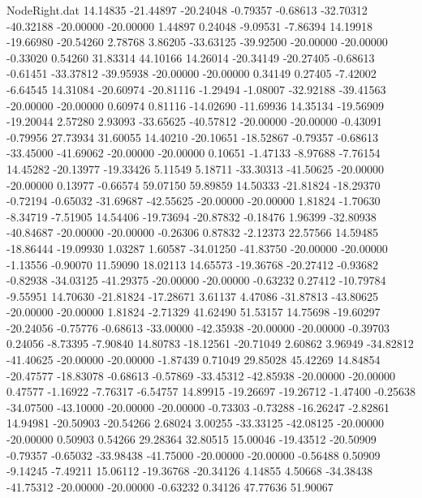 \begin{filecontents}{NodeRight.dat}
  14.14835  -21.44897  -20.24048    -0.79357   -0.68613  -32.70312  -40.32188  -20.00000  -20.00000    1.44897    0.24048   -9.09531   -7.86394
  14.19918  -19.66980  -20.54260     2.78768    3.86205  -33.63125  -39.92500  -20.00000  -20.00000   -0.33020    0.54260   31.83314   44.10166
  14.26014  -20.34149  -20.27405    -0.68613   -0.61451  -33.37812  -39.95938  -20.00000  -20.00000    0.34149    0.27405   -7.42002   -6.64545
  14.31084  -20.60974  -20.81116    -1.29494   -1.08007  -32.92188  -39.41563  -20.00000  -20.00000    0.60974    0.81116  -14.02690  -11.69936
  14.35134  -19.56909  -19.20044     2.57280    2.93093  -33.65625  -40.57812  -20.00000  -20.00000   -0.43091   -0.79956   27.73934   31.60055
  14.40210  -20.10651  -18.52867    -0.79357   -0.68613  -33.45000  -41.69062  -20.00000  -20.00000    0.10651   -1.47133   -8.97688   -7.76154
  14.45282  -20.13977  -19.33426     5.11549    5.18711  -33.30313  -41.50625  -20.00000  -20.00000    0.13977   -0.66574   59.07150   59.89859
  14.50333  -21.81824  -18.29370    -0.72194   -0.65032  -31.69687  -42.55625  -20.00000  -20.00000    1.81824   -1.70630   -8.34719   -7.51905
  14.54406  -19.73694  -20.87832    -0.18476    1.96399  -32.80938  -40.84687  -20.00000  -20.00000   -0.26306    0.87832   -2.12373   22.57566
  14.59485  -18.86444  -19.09930     1.03287    1.60587  -34.01250  -41.83750  -20.00000  -20.00000   -1.13556   -0.90070   11.59090   18.02113
  14.65573  -19.36768  -20.27412    -0.93682   -0.82938  -34.03125  -41.29375  -20.00000  -20.00000   -0.63232    0.27412  -10.79784   -9.55951
  14.70630  -21.81824  -17.28671     3.61137    4.47086  -31.87813  -43.80625  -20.00000  -20.00000    1.81824   -2.71329   41.62490   51.53157
  14.75698  -19.60297  -20.24056    -0.75776   -0.68613  -33.00000  -42.35938  -20.00000  -20.00000   -0.39703    0.24056   -8.73395   -7.90840
  14.80783  -18.12561  -20.71049     2.60862    3.96949  -34.82812  -41.40625  -20.00000  -20.00000   -1.87439    0.71049   29.85028   45.42269
  14.84854  -20.47577  -18.83078    -0.68613   -0.57869  -33.45312  -42.85938  -20.00000  -20.00000    0.47577   -1.16922   -7.76317   -6.54757
  14.89915  -19.26697  -19.26712    -1.47400   -0.25638  -34.07500  -43.10000  -20.00000  -20.00000   -0.73303   -0.73288  -16.26247   -2.82861
  14.94981  -20.50903  -20.54266     2.68024    3.00255  -33.33125  -42.08125  -20.00000  -20.00000    0.50903    0.54266   29.28364   32.80515
  15.00046  -19.43512  -20.50909    -0.79357   -0.65032  -33.98438  -41.75000  -20.00000  -20.00000   -0.56488    0.50909   -9.14245   -7.49211
  15.06112  -19.36768  -20.34126     4.14855    4.50668  -34.38438  -41.75312  -20.00000  -20.00000   -0.63232    0.34126   47.77636   51.90067

\end{filecontents}
